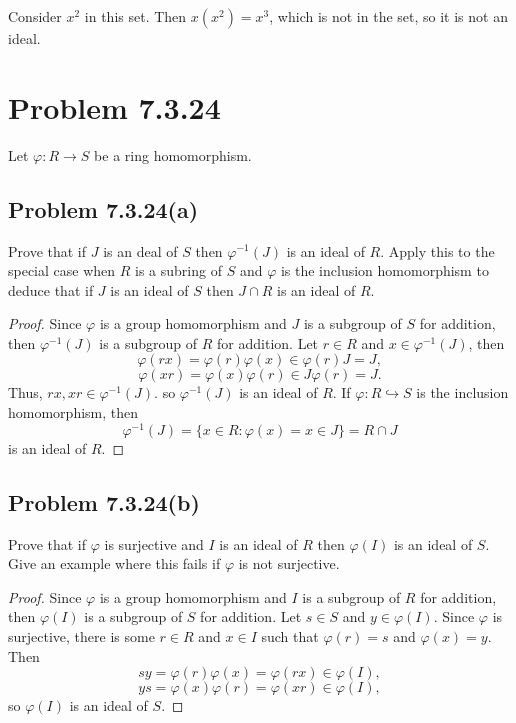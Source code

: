 \documentclass[12pt]{article}
\newenvironment{problem}
    {\begin{lrbox}{\mybox}\begin{minipage}{0.98\textwidth}}
    {\end{minipage}\end{lrbox}\begin{center}\framebox[\textwidth]{\usebox{\mybox}}\end{center}}
\theoremstyle{definition}
\renewcommand{\phi}{\varphi}
\newcommand{\inc}{\hookrightarrow}
\begin{document}
Consider $x^2$ in this set. Then $x(x^2) = x^3$, which is not in the set, so it is not an ideal.

\section{Problem 7.3.24}
\begin{problem}
    Let $\phi : R \to S$ be a ring homomorphism.
\end{problem}

\subsection{Problem 7.3.24(a)}
\begin{problem}
    Prove that if $J$ is an deal of $S$ then $\phi^{-1}(J)$ is an ideal of $R$. Apply this to the special case when $R$ is a subring of $S$ and $\phi$ is the inclusion homomorphism to deduce that if $J$ is an ideal of $S$ then $J\cap R$ is an ideal of $R$.
\end{problem}

\begin{proof}
    Since $\phi$ is a group homomorphism and $J$ is a subgroup of $S$ for addition, then $\phi^{-1}(J)$ is a subgroup of $R$ for addition. Let $r \in R$ and $x \in \phi^{-1}(J)$, then
    \[
        \phi(rx) = \phi(r)\phi(x) \in \phi(r)J = J,
    \]
    \[
        \phi(xr) = \phi(x)\phi(r) \in J\phi(r) = J.
    \]
    Thus, $rx, xr \in \phi^{-1}(J)$. so $\phi^{-1}(J)$ is an ideal of $R$. If $\phi : R \inc S$ is the inclusion homomorphism, then
    \[
        \phi^{-1}(J) = \{x \in R : \phi(x) = x \in J\} = R \cap J
    \]
    is an ideal of $R$.

\end{proof}

\subsection{Problem 7.3.24(b)}
\begin{problem}
    Prove that if $\phi$ is surjective and $I$ is an ideal of $R$ then $\phi(I)$ is an ideal of $S$. Give an example where this fails if $\phi$ is not surjective.
\end{problem}

\begin{proof}
    Since $\phi$ is a group homomorphism and $I$ is a subgroup of $R$ for addition, then $\phi(I)$ is a subgroup of $S$ for addition. Let $s \in S$ and $y \in \phi(I)$. Since $\phi$ is surjective, there is some $r \in R$ and $x \in I$ such that $\phi(r) = s$ and $\phi(x) = y$. Then
    \[
        sy = \phi(r)\phi(x) = \phi(rx) \in \phi(I),
    \]
    \[
        ys = \phi(x)\phi(r) = \phi(xr) \in \phi(I),
    \]
    so $\phi(I)$ is an ideal of $S$.
    
\end{proof}
\end{document}
